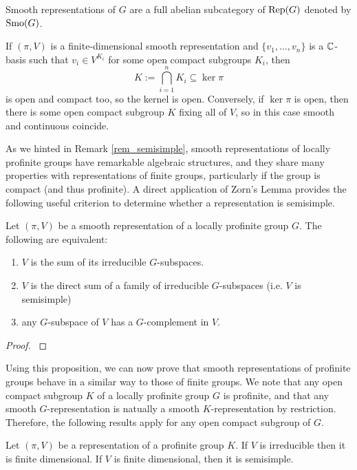 Smooth representations of $G$ are a full abelian subcategory of $\mathrm{Rep}(G)$ denoted by $\mathrm{Smo}(G)$. 


\begin{rem}\label{rem:contsmooth}
    If $(\pi,V)$ is a finite-dimensional smooth representation and $\{v_1,\ldots,v_n\}$ is a $\mathbb{C}$-basis such that $v_i\in V^{K_i}$ for some open compact subgroups $K_i$, then 
    $$K:=\bigcap_{i=1}^n K_i\subseteq\ker\pi$$
    is open and compact too, so the kernel is open. 
    Conversely, if $\ker\pi$ is open, then there is some open compact subgroup $K$ fixing all of $V$, so in this case smooth and continuous coincide. 
\end{rem}


As we hinted in Remark \ref{rem_semisimple}, smooth representations of locally profinite groups have remarkable algebraic structures, and they share many properties with representations of finite groups, particularly if the group is compact (and thus profinite). A direct application of Zorn's Lemma provides the following useful criterion to determine whether a representation is semisimple. 

\begin{prop}\label{prop_semisimple}
    Let $(\pi,V)$ be a smooth representation of a locally profinite group $G$. The following are equivalent:
    \begin{enumerate}
        \item $V$ is the sum of its irreducible $G$-subspaces.
        \item $V$ is the direct sum of a family of irreducible $G$-subspaces (i.e. $V$ is semisimple)
        \item any $G$-subspace of $V$ has a $G$-complement in $V$.
    \end{enumerate}
\end{prop}

\begin{proof}
    \cite[Lemma 2.2]{BH1}
\end{proof}

Using this proposition, we can now prove that smooth representations of profinite groups behave in a similar way to those of finite groups. We note that any open compact subgroup $K$ of a locally profinite group $G$ is profinite, and that any smooth $G$-representation is natually a smooth $K$-representation by restriction. Therefore, the following results apply for any open compact subgroup of $G$.

\begin{prop}\label{lem_profinite_smooth}
    Let $(\pi,V)$ be a representation of a profinite group $K$. If $V$ is irreducible then it is finite dimensional. If $V$ is finite dimensional, then it is semisimple.
\end{prop}


